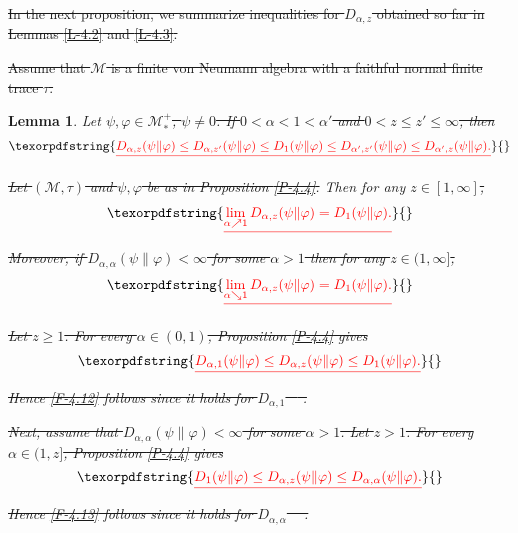\documentclass[12pt]{article}
\newtheorem{coro}{Corollary} %
\newtheorem{lemma}[theorem]{Lemma}
\newtheorem{prop}{Proposition} %
\theoremstyle{definition}
\theoremstyle{remark}
\def\Me{\mathcal M}
\def\ffi{\varphi}
\providecommand{\DIFaddtex}[1]{{\protect\color{blue}\uwave{#1}}} %
\providecommand{\DIFdeltex}[1]{{\protect\color{red}\sout{#1}}}                      %
\providecommand{\DIFaddbegin}{} %
\providecommand{\DIFaddend}{} %
\providecommand{\DIFdelbegin}{} %
\providecommand{\DIFdelend}{} %
\providecommand{\DIFadd}[1]{\texorpdfstring{\DIFaddtex{#1}}{#1}} %
\providecommand{\DIFdel}[1]{\texorpdfstring{\DIFdeltex{#1}}{}} %
\begin{document}
\DIFdelbegin \DIFdel{In the next proposition, we summarize inequalities for $D_{\alpha,z}$ obtained so far in Lemmas \ref{L-4.2}
and \ref{L-4.3}.
}%

\DIFdel{Assume that $\Me$ is a finite von Neumann algebra with a faithful normal finite trace $\tau$.
}\DIFdelend \DIFaddbegin \begin{lemma}\label{lemma:order} \DIFaddend Let \DIFdelbegin \DIFdel{$\psi,\ffi\in\Me_*^+$, $\psi\ne0$. If $0<\alpha<1<\alpha'$ and $0<z\le z'\le\infty$, then
}\[
\DIFdel{D_{\alpha,z}(\psi\|\ffi)\le D_{\alpha,z'}(\psi\|\ffi)\le D_1(\psi\|\ffi)
\le D_{\alpha',z'}(\psi\|\ffi)\le D_{\alpha',z}(\psi\|\ffi).
}\]%

\DIFdel{Let $(\Me,\tau)$ and $\psi,\ffi$ be as in Proposition \ref{P-4.4}. }\DIFdelend \DIFaddbegin \DIFadd{$\psi,\varphi\in \Me_*^+$ with $\psi\le \varphi$.
}\DIFaddend Then for any \DIFdelbegin \DIFdel{$z\in[1,\infty]$,
}\begin{align*}\DIFdel{%
\lim_{\alpha\nearrow1}D_{\alpha,z}(\psi\|\ffi)=D_1(\psi\|\ffi).
}\end{align*}%
\DIFdel{Moreover, if $D_{\alpha,\alpha}(\psi\|\ffi)<\infty$ for some $\alpha>1$ then for any $z\in(1,\infty]$,
}\begin{align*}\DIFdel{%
\lim_{\alpha\searrow1}D_{\alpha,z}(\psi\|\ffi)=D_1(\psi\|\ffi).
}\end{align*}%

\DIFdel{Let $z\ge1$. For every $\alpha\in(0,1)$, Proposition \ref{P-4.4} gives
}\[
\DIFdel{D_{\alpha,1}(\psi\|\ffi)\le D_{\alpha,z}(\psi\|\ffi)\le D_1(\psi\|\ffi).
}\]%
\DIFdel{Hence \eqref{F-4.12} follows since it holds for $D_{\alpha,1}$ \mbox{%
\cite[Proposition 5.3(3)]{hiai2018quantum}}\hskip0pt%
.
}%

\DIFdel{Next, assume that $D_{\alpha,\alpha}(\psi\|\ffi)<\infty$ for some $\alpha>1$. Let $z>1$. For every
$\alpha\in(1,z]$, Proposition \ref{P-4.4} gives
}\[
\DIFdel{D_1(\psi\|\ffi)\le D_{\alpha,z}(\psi\|\ffi)\le D_{\alpha,\alpha}(\psi\|\ffi).
}\]%
\DIFdel{Hence \eqref{F-4.13} follows since it holds for $D_{\alpha,\alpha}$ \mbox{%
\cite[Proposition 3.8(ii)]{jencova2018renyi}}\hskip0pt%
.
}%


\end{lemma}
\end{document}
